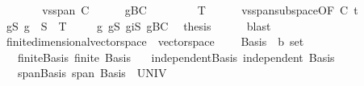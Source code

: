 \begin{isabellebody}
\ \ \isamarkupfalse%
\ \isamarkupfalse%
\ {\isachardoublequoteopen}{\isasymdots}\ {\isacharequal}{\kern0pt}\ vs{}{\isachardot}{\kern0pt}span\ C{\isachardoublequoteclose}\isanewline
\ \ \ \ \isamarkupfalse%
\ gBC\ \isacommand{{\isachardot}{\kern0pt}{\isachardot}{\kern0pt}}\isamarkupfalse%
\isanewline
\ \ \isamarkupfalse%
\ \isamarkupfalse%
\ {\isachardoublequoteopen}{\isasymdots}\ {\isacharequal}{\kern0pt}\ T{\isachardoublequoteclose}\isanewline
\ \ \ \ \isamarkupfalse%
\ vs{}{\isachardot}{\kern0pt}span{\isacharunderscore}{\kern0pt}subspace{\isacharbrackleft}{\kern0pt}OF\ C{\isacharparenleft}{\kern0pt}{}{\isacharcomma}{\kern0pt}{}{\isacharparenright}{\kern0pt}\ t{\isacharbrackright}{\kern0pt}\ \isacommand{{\isachardot}{\kern0pt}}\isamarkupfalse%
\isanewline
\ \ \isamarkupfalse%
\ \isamarkupfalse%
\ gS{\isacharcolon}{\kern0pt}\ {\isachardoublequoteopen}g\ {\isacharbackquote}{\kern0pt}\ S\ {\isacharequal}{\kern0pt}\ T{\isachardoublequoteclose}\ \isacommand{{\isachardot}{\kern0pt}}\isamarkupfalse%
\isanewline
\ \ \isamarkupfalse%
\ g{\isacharparenleft}{\kern0pt}{}{\isacharparenright}{\kern0pt}\ gS\ giS\ gBC\ \isamarkupfalse%
\ {\isacharquery}{\kern0pt}thesis\isanewline
\ \ \ \ \isamarkupfalse%
\ blast\isanewline
{}\isamarkupfalse%
%
\endisatagproof
{\isafoldproof}%
%
\isadelimproof
\isanewline
%
\endisadelimproof
\isanewline
{}\isamarkupfalse%
\isanewline
\isanewline
\isanewline
{}\isamarkupfalse%
\ finite{\isacharunderscore}{\kern0pt}dimensional{\isacharunderscore}{\kern0pt}vector{\isacharunderscore}{\kern0pt}space\ {\isacharequal}{\kern0pt}\ vector{\isacharunderscore}{\kern0pt}space\ {\isacharplus}{\kern0pt}\isanewline
\ \ \ Basis\ {\isacharcolon}{\kern0pt}{\isacharcolon}{\kern0pt}\ {\isachardoublequoteopen}{\isacharprime}{\kern0pt}b\ set{\isachardoublequoteclose}\isanewline
\ \ \ finite{\isacharunderscore}{\kern0pt}Basis{\isacharcolon}{\kern0pt}\ {\isachardoublequoteopen}finite\ Basis{\isachardoublequoteclose}\isanewline
\ \ \ independent{\isacharunderscore}{\kern0pt}Basis{\isacharcolon}{\kern0pt}\ {\isachardoublequoteopen}independent\ Basis{\isachardoublequoteclose}\isanewline
\ \ \ span{\isacharunderscore}{\kern0pt}Basis{\isacharcolon}{\kern0pt}\ {\isachardoublequoteopen}span\ Basis\ {\isacharequal}{\kern0pt}\ UNIV{\isachardoublequoteclose}\isanewline

\end{isabellebody}
